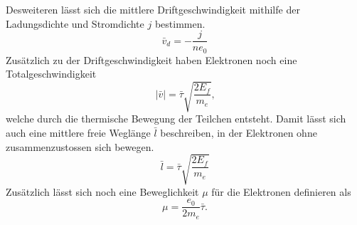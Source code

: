 \noindent Desweiteren lässt sich die mittlere Driftgeschwindigkeit mithilfe der Ladungsdichte und Stromdichte $j$ bestimmen.
\begin{equation}
    \bar{v}_d=-\frac{j}{ne_0}
    \label{eqn:drift}
\end{equation}
Zusätzlich zu der Driftgeschwindigkeit haben Elektronen noch eine Totalgeschwindigkeit
\begin{equation}
    |\bar{v}|=\bar{\tau}\sqrt{\frac{2E_f}{m_e}}\text{,} 
    \label{eqn:total}
\end{equation}
\noindent welche durch die thermische Bewegung der Teilchen entsteht. Damit lässt sich auch eine mittlere freie Weglänge $\bar{l}$
beschreiben, in der Elektronen ohne zusammenzustossen sich bewegen.
\begin{equation}
    \bar{l}=\bar{\tau}\sqrt{\frac{2E_f}{m_e}}
    \label{eqn:Weglänge}
\end{equation}
\noindent Zusätzlich lässt sich noch eine Beweglichkeit $\mu$ für die Elektronen definieren als
\begin{equation}
    \mu=\frac{e_0}{2m_e}\bar{\tau}\text{.}
    \label{eqn:Beweglichkeit}
\end{equation}

